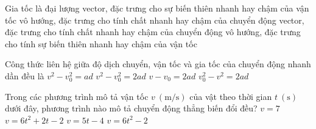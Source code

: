 \begin{ex}
	Gia tốc là đại lượng
	\choice
	{\True vector, đặc trưng cho sự biến thiên nhanh hay chậm của vận tốc}
	{vô hướng, đặc trưng cho tính chất nhanh hay chậm của chuyển động}
	{vector, đặc trưng cho tính chất nhanh hay chậm của chuyển động}
	{vô hướng, đặc trưng cho tính sự biến thiên nhanh hay chậm của vận tốc}
	\loigiai{}
\end{ex}
\begin{ex}
	Công thức liên hệ giữa độ dịch chuyển, vận tốc và gia tốc của chuyển động nhanh dần đều là
	\choice
	{$v^2-v^2_0=ad$}
	{\True $v^2-v^2_0=2ad$}
	{$v-v_0=2ad$}
	{$v^2_0-v^2=2ad$}
	\loigiai{}
\end{ex}
\begin{ex}
	Trong các phương trình mô tả vận tốc $v\ \left(\si{\meter/\second}\right)$ của vật theo thời gian $t\ \left(\si{\second}\right)$ dưới đây, phương trình nào mô tả chuyển động thẳng biến đổi đều?
	\choice
	{$v=7$}
	{$v=6t^2+2t-2$}
	{\True $v=5t-4$}
	{$v=6t^2-2$}
	\loigiai{}
\end{ex}
